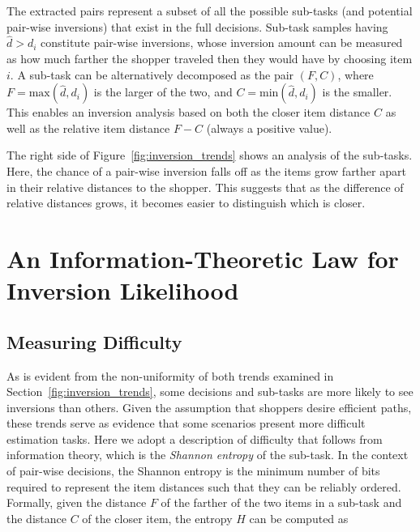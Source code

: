 \documentclass[aps,pre,twocolumn,groupedaddress]{revtex4-2}
\newcommand{\nes}[1]{\textcolor{red}{#1}}
\begin{document}
The extracted pairs represent a subset of all the possible sub-tasks (and potential pair-wise inversions) that exist in the full decisions. Sub-task samples having $\hat{d} > d_{i}$ constitute pair-wise inversions, whose inversion amount can be measured as how much farther the shopper traveled then they would have by choosing item $i$. A sub-task can be alternatively decomposed as the pair $(F,C)$, where $F = \text{max}(\hat{d},d_{i})$ is the larger of the two, and $C = \text{min}(\hat{d},d_{i})$ is the smaller. This enables an inversion analysis based on both the closer item distance $C$ as well as the relative item distance $F-C$ (always a positive value). 

The right side of Figure~\ref{fig:inversion_trends} shows an analysis of the sub-tasks. Here, the chance of a pair-wise inversion falls off as the items grow farther apart in their relative distances to the shopper. This suggests that as the difference of relative distances grows, it becomes easier to distinguish which is closer.

\section{An Information-Theoretic Law for Inversion Likelihood}
\label{sec:inversion_law}
\subsection{Measuring Difficulty}
\label{sec:difficulty}
As is evident from the non-uniformity of both trends examined in Section~\ref{fig:inversion_trends}, some  decisions and sub-tasks are more likely to see inversions than others. Given the assumption that shoppers desire efficient paths, these trends serve as evidence that some scenarios present more difficult estimation tasks. Here we adopt a description of difficulty that follows from information theory, which is the \textit{Shannon entropy} of the sub-task. In the context of pair-wise decisions, the Shannon entropy is the minimum number of bits required to represent the item distances such that they can be reliably ordered. Formally, given the distance $F$ of the farther of the two items in a sub-task and the distance $C$ of the closer item, the entropy $H$ can be computed as
\end{document}
